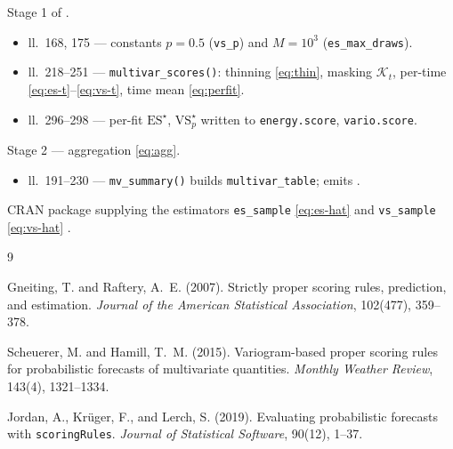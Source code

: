 \documentclass[11pt]{article}
\begin{document}
\begin{description}[leftmargin=2.4em, itemsep=2pt]
  \item[\texttt{scores.R}] Stage 1 of .
    \begin{itemize}[leftmargin=1.3em, itemsep=1pt]
      \item ll.~168, 175 --- constants $p=0.5$ (\texttt{vs\_p}) and
            $M=10^3$ (\texttt{es\_max\_draws}).
      \item ll.~218--251 --- \texttt{multivar\_scores()}: thinning
            \eqref{eq:thin}, masking $\mathcal K_t$, per-time
            \eqref{eq:es-t}--\eqref{eq:vs-t}, time mean \eqref{eq:perfit}.
      \item ll.~296--298 --- per-fit $\mathrm{ES}^\star$,
            $\mathrm{VS}_p^\star$ written to \texttt{energy.score},
            \texttt{vario.score}.
    \end{itemize}
  \item[\texttt{tables.R}] Stage 2 --- aggregation \eqref{eq:agg}.
    \begin{itemize}[leftmargin=1.3em, itemsep=1pt]
      \item ll.~191--230 --- \texttt{mv\_summary()} builds
            \texttt{multivar\_table}; emits
            .
    \end{itemize}
  \item[\texttt{scoringRules}] CRAN package supplying the estimators
    \texttt{es\_sample} \eqref{eq:es-hat} and \texttt{vs\_sample}
    \eqref{eq:vs-hat} \cite{jordan2019}.
\end{description}

\begin{thebibliography}{9}

Gneiting, T. and Raftery, A.~E. (2007).
Strictly proper scoring rules, prediction, and estimation.
\emph{Journal of the American Statistical Association}, 102(477),
359--378.

Scheuerer, M. and Hamill, T.~M. (2015).
Variogram-based proper scoring rules for probabilistic forecasts of
multivariate quantities.
\emph{Monthly Weather Review}, 143(4), 1321--1334.

Jordan, A., Kr\"uger, F., and Lerch, S. (2019).
Evaluating probabilistic forecasts with \texttt{scoringRules}.
\emph{Journal of Statistical Software}, 90(12), 1--37.

\end{thebibliography}
\end{document}
